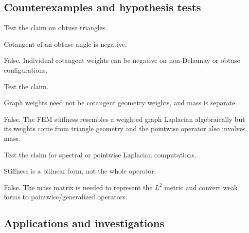 \subsection*{Counterexamples and hypothesis tests}

\begin{exercise}\label{exr:vii41-ped-10}
Test the claim on obtuse triangles.
\end{exercise}

\begin{hint}
Cotangent of an obtuse angle is negative.
\end{hint}

\begin{solution}
False.  Individual cotangent weights can be negative on non-Delaunay or obtuse configurations.
\end{solution}

\begin{exercise}\label{exr:vii41-ped-11}
Test the claim.
\end{exercise}

\begin{hint}
Graph weights need not be cotangent geometry weights, and mass is separate.
\end{hint}

\begin{solution}
False.  The FEM stiffness resembles a weighted graph Laplacian algebraically but its weights come from triangle geometry and the pointwise operator also involves mass.
\end{solution}

\begin{exercise}\label{exr:vii41-ped-12}
Test the claim for spectral or pointwise Laplacian computations.
\end{exercise}

\begin{hint}
Stiffness is a bilinear form, not the whole operator.
\end{hint}

\begin{solution}
False.  The mass matrix is needed to represent the \(L^2\) metric and convert weak forms to pointwise/generalized operators.
\end{solution}

\subsection*{Applications and investigations}

